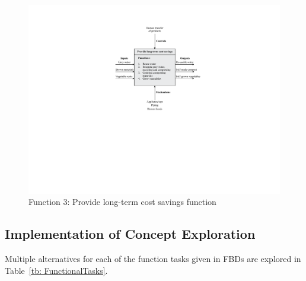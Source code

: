 \documentclass[a4paper,11pt,fleqn]{report}
\begin{document}
%
\begin{figure}[h!]
\begin{center}
\includegraphics[scale = 0.8]{Function3.pdf}
\caption{Function 3: Provide long-term cost savings function}
\label{fig: Function3}
\end{center}
\end{figure}

\subsection{Implementation of Concept Exploration}
Multiple alternatives for each of the function tasks given in \ac{FBD}s are explored in Table~\ref{tb: FunctionalTasks}.
%
\end{document}
